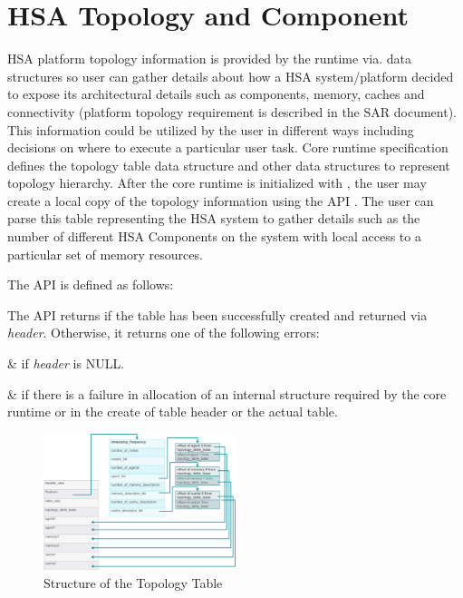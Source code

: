 \hypertarget{component}{}\section{HSA Topology and Component
}\label{topology}
HSA platform topology information is provided by the runtime via.
data structures so user can gather details about how a HSA
system/platform decided to expose its architectural details such as
components, memory, caches and connectivity (platform topology
requirement is described in the SAR document).  This information
could be utilized by the user in different ways including decisions
on where to execute a particular user task.  Core runtime
specification defines the topology table data structure and other
data structures to represent topology hierarchy.  After the core
runtime is initialized with , the user may create a
local copy of the topology information using the API
. The user can parse this table
representing the HSA system to gather details such as the number of
different HSA Components on the system with local access to a
particular set of memory resources.

The  API is defined as follows:



The API returns  if the table has been
successfully created and returned via {\itshape header}. Otherwise,
it returns one of the following errors:

\begin{easylist}
&  if {\itshape header}
is NULL.

&  if there is a failure
in allocation of an internal structure required by the core runtime
or in the create of table header or the actual table.
\end{easylist}

\begin{figure}
  \centering
  \includegraphics[width=0.5\textwidth]{topologytable}
  \centering
  \caption{Structure of the Topology Table}
  \label{fig:topology_table}
\end{figure}


